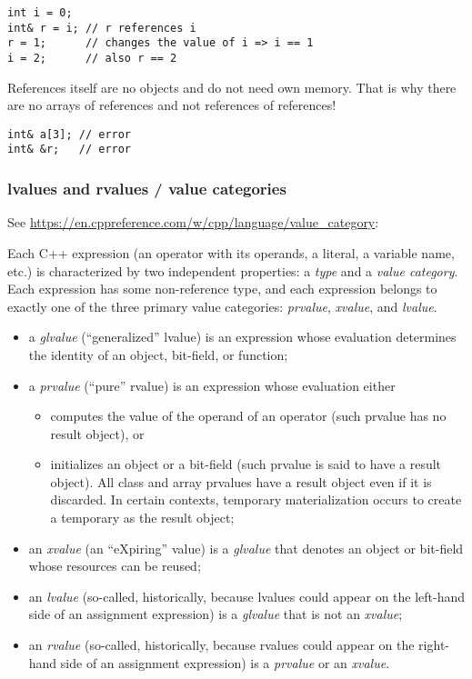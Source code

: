 \begin{verbatim}
int i = 0;
int& r = i; // r references i
r = 1;      // changes the value of i => i == 1
i = 2;      // also r == 2
\end{verbatim}

References itself are no objects and do not need own memory. That is why there are no arrays of references and not references of references!
\begin{verbatim}
int& a[3]; // error
int& &r;   // error
\end{verbatim}


\subsubsection{lvalues and rvalues / value categories}
See \url{https://en.cppreference.com/w/cpp/language/value_category}:

Each C++ expression (an operator with its operands, a literal, a variable name, etc.) is characterized by two independent properties:
a \emph{type} and a \emph{value category}. Each expression has some non-reference type, and each expression belongs to exactly one of the three
primary value categories: \emph{prvalue}, \emph{xvalue}, and \emph{lvalue}.
\begin{itemize}
  \item a \emph{glvalue} (``generalized'' lvalue) is an expression whose evaluation determines the identity of an object, bit-field, or function;
  \item a \emph{prvalue} (``pure'' rvalue) is an expression whose evaluation either \begin{itemize}
      \item computes the value of the operand of an operator (such prvalue has no result object), or
      \item initializes an object or a bit-field (such prvalue is said to have a result object). All class and array prvalues have a result object
            even if it is discarded. In certain contexts, temporary materialization occurs to create a temporary as the result object;
  \end{itemize}
  \item an \emph{xvalue} (an ``eXpiring'' value) is a \emph{glvalue} that denotes an object or bit-field whose resources can be reused;
  \item an \emph{lvalue} (so-called, historically, because lvalues could appear on the left-hand side of an assignment expression) is a
        \emph{glvalue} that is not an \emph{xvalue};
  \item an \emph{rvalue} (so-called, historically, because rvalues could appear on the right-hand side of an assignment expression) is a
        \emph{prvalue} or an \emph{xvalue}.
\end{itemize}

